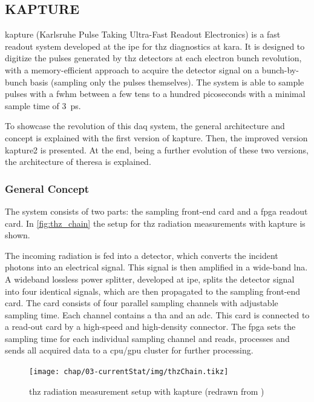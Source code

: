 \subsection{KAPTURE}
\Gls{kapture} (Karlsruhe Pulse Taking Ultra-Fast Readout Electronics) is a fast readout system developed at the \gls{ipe} for \gls{thz} diagnostics at \gls{kara}. 
It is designed to digitize the pulses generated by \gls{thz} detectors at each electron bunch revolution, with a memory-efficient approach to acquire the detector signal on a bunch-by-bunch basis (sampling only the pulses themselves). 
The system is able to sample pulses with a \gls{fwhm} between a few tens to a hundred picoseconds with a minimal sample time of \SI{3}{\pico \second}. \cite{caselleKAP}

To showcase the revolution of this \gls{daq} system, the general architecture and concept is explained with the first version of \gls{kapture}.
Then, the improved version \gls{kapture2} is presented.
At the end, being a further evolution of these two versions, the architecture of \gls{theresa} is explained.

\subsubsection*{General Concept}
The system consists of two parts: the sampling front-end card and a \gls{fpga} readout card. In \autoref{fig:thz_chain} the setup for \gls{thz} radiation measurements with \gls{kapture} is shown. 

The incoming radiation is fed into a detector, which converts the incident photons into an electrical signal. 
This signal is then amplified in a wide-band \gls{lna}. 
A wideband lossless power splitter, developed at \gls{ipe}, splits the detector signal into four identical signals, which are then propagated to the sampling front-end card. 
The card consists of four parallel sampling channels with adjustable sampling time. 
Each channel contains a \gls{tha} and an \gls{adc}. 
This card is connected to a read-out card by a high-speed and high-density connector. 
The \gls{fpga} sets the sampling time for each individual sampling channel and reads, processes and sends all acquired data to a \gls{cpu}/\gls{gpu} cluster for further processing. \cite{caselle2014}

\begin{figure}[tbh]
	\centering
	\texttt{[image: chap/03-currentStat/img/thzChain.tikz]}
	\caption[THz measurement with KAPTURE]{\gls{thz} radiation measurement setup with \gls{kapture} (redrawn from \cite{caselle2014})}
	\label{fig:thz_chain}
\end{figure}

